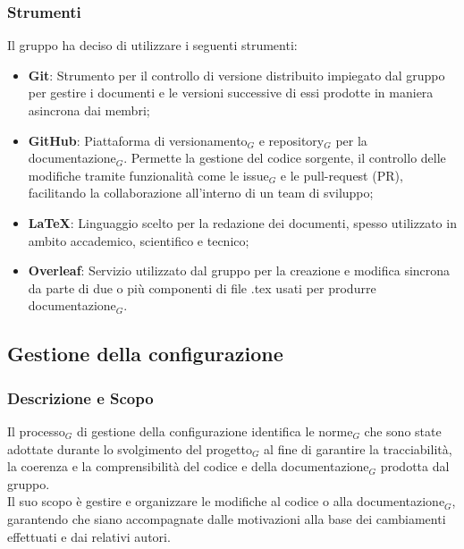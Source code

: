 \documentclass[10pt]{article}
\begin{document}
\begin{justify}
    \subsubsection{Strumenti}
    Il gruppo ha deciso di utilizzare i seguenti strumenti:
    \begin{itemize}
        \item \textbf{Git}: Strumento per il controllo di versione distribuito impiegato dal gruppo per gestire i documenti e le versioni successive di essi prodotte in maniera asincrona dai membri;
        \item \textbf{GitHub}: Piattaforma di versionamento$_G$ e repository$_G$ per la documentazione$_G$. Permette la gestione del codice sorgente, il controllo delle modifiche tramite funzionalità come le issue$_G$ e le pull-request (PR), facilitando la collaborazione all’interno di un team di sviluppo;
        \item \textbf{\LaTeX}: Linguaggio scelto per la redazione dei documenti, spesso utilizzato in ambito accademico, scientifico e tecnico;
        \item \textbf{Overleaf}: Servizio utilizzato dal gruppo per la creazione e modifica sincrona da parte di due o più componenti di file .tex usati per produrre documentazione$_G$.
    \end{itemize}

    \subsection{Gestione della configurazione}
    \label{gestione-configurazione}
    \subsubsection{Descrizione e Scopo}
    Il processo$_G$ di gestione della configurazione identifica le norme$_G$ che sono state adottate durante lo svolgimento del progetto$_G$ al fine di garantire la tracciabilità, la coerenza e la comprensibilità del codice e della documentazione$_G$ prodotta dal gruppo.\\
    Il suo scopo è gestire e organizzare le modifiche al codice o alla documentazione$_G$, garantendo che siano accompagnate dalle motivazioni alla base dei cambiamenti effettuati e dai relativi autori.


\end{justify}
\end{document}
